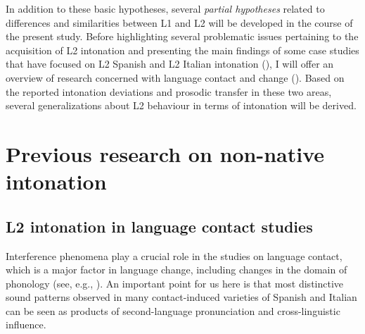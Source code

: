 In addition to these basic hypotheses, several \textit{partial hypotheses} related to differences and similarities between L1 and L2 will be developed in the course of the present study. Before highlighting several problematic issues pertaining to the acquisition of L2 intonation and presenting the main findings of some case studies that have focused on L2 Spanish and L2 Italian intonation (), I will offer an overview of research concerned with language contact and change (). Based on the reported intonation deviations and prosodic transfer in these two areas, several generalizations about L2 behaviour in terms of intonation will be derived.

\section{Previous research on non-native intonation}\label{sec:1.4} %
\subsection{L2 intonation in language contact studies}\label{sec:1.4.1}

Interference phenomena play a crucial role in the studies on language contact, which is a major factor in language change, including changes in the domain of phonology (see, e.g., \citealt{Weinreich1953, ThomasonKaufman1988, McMahon2004}). An important point for us here is that most distinctive sound patterns observed in many contact-induced varieties of Spanish and Italian can be seen as products of second-language pronunciation and cross-linguistic influence.


